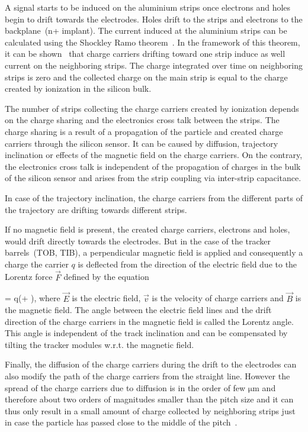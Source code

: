 A signal starts to be induced on the aluminium strips once electrons and holes begin to drift towards the electrodes. Holes drift to the strips and electrons to the backplane~(n+ implant). The current induced at the aluminium strips can be calculated using the Shockley Ramo theorem~\cite{doi:10.1063/1.1710367,Ramo:1939vr}. In the framework of this theorem, it can be shown~\cite{Bloch:2007zza} that charge carriers drifting toward one strip induce as well current on the neighboring strips. The charge integrated over time on neighboring strips is zero and the collected charge on the main strip is equal to the charge created by ionization in the silicon bulk.

The number of strips collecting the charge carriers created by ionization depends on the charge sharing and the electronics cross talk between the strips. The charge sharing is a result of a propagation of the particle and created charge carriers through the silicon sensor. It can be caused by diffusion, trajectory inclination or effects of the magnetic field on the charge carriers. On the contrary, the electronics cross talk is independent of the propagation of charges in the bulk of the silicon sensor and arises from the strip coupling via inter-strip capacitance.  

In case of the trajectory inclination, the charge carriers from the different parts of the trajectory are drifting towards different strips. 

If no magnetic field is present, the created charge carriers, electrons and holes, would drift directly towards the electrodes. But in the case of the tracker barrels~(TOB, TIB), a perpendicular magnetic field is applied  and consequently  a charge the carrier $q$ is deflected from the direction of the electric field due to the Lorentz force $\vec{F}$ defined by the equation

{
   =  q(+ \times {}),
}
where $\vec{E}$ is the electric field, $\vec{v}$ is the velocity of charge carriers and $\vec{B}$ is the magnetic field. The angle between the electric field lines and the drift direction of the charge carriers in the magnetic field is called the Lorentz angle. This angle is independent of the track inclination and can be compensated by tilting the tracker modules w.r.t. the magnetic field.

Finally, the diffusion of the charge carriers during the drift to the electrodes can also modify the path of the charge carriers from the straight line. However the spread of the charge carriers due to diffusion is in  the order of few $\mathrm{\mu m}$ and therefore about two orders of magnitudes smaller than the pitch size and it can thus only result in a small amount of charge collected by neighboring strips just in case the particle has passed close to the middle of the pitch~\cite{Bloch:2007zza}.


